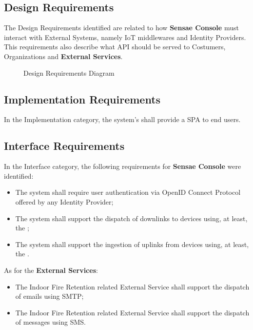 \subsection{Design Requirements}
\label{subsec:requirements:non_functional:design}

The Design Requirements identified are related to how \textbf{Sensae Console} must interact with External Systems, namely \gls{IoT} middlewares and Identity Providers. This requirements also describe what \gls{API} should be served to Costumers, Organizations and \textbf{External Services}.

\begin{figure}[H]
    \centering
   \resizebox{0.5\columnwidth}{!}
   {
      
   }
   \caption[Design Requirements Diagram]{Design Requirements Diagram}
   \label{fig:requirements:non_functional:design}
\end{figure}

\subsection{Implementation Requirements}
\label{subsec:requirements:non_functional:implementation}

In the Implementation category, the system's shall provide a \gls{SPA} to end users.

\subsection{Interface Requirements}
\label{subsec:requirements:non_functional:interface}

In the Interface category, the following requirements for \textbf{Sensae Console} were identified:

\begin{itemize}
    \item The system shall require user authentication via OpenID Connect Protocol offered by any Identity Provider;
    \item The system shall support the dispatch of downlinks to devices using, at least, the ;
    \item The system shall support the ingestion of uplinks from devices using, at least, the .
\end{itemize}

As for the \textbf{External Services}:

\begin{itemize}
    \item The Indoor Fire Retention related External Service shall support the dispatch of emails using \gls{SMTP};
    \item The Indoor Fire Retention related External Service shall support the dispatch of messages using \gls{SMS}.
\end{itemize}

